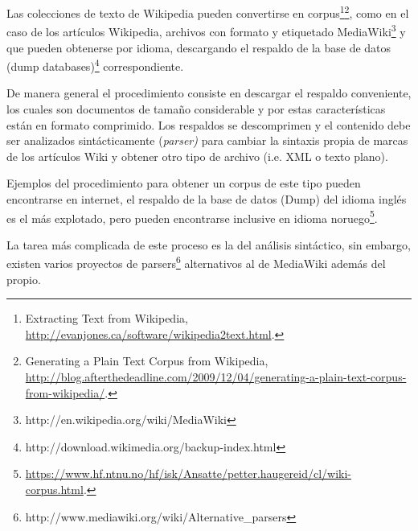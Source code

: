 \documentclass[letterpaper]{article}
\newcommand\textstylebibuscitbase[1]{#1}
\begin{document}
{\sffamily
\textstylebibuscitbase{Las colecciones de texto de Wikipedia pueden
convertirse en corpus}\footnote{\foreignlanguage{english}{Extracting
Text from Wikipedia,
}\url{http://evanjones.ca/software/wikipedia2text.html}\foreignlanguage{english}{.}}\footnote{\foreignlanguage{english}{G}\foreignlanguage{english}{enerating
a Plain Text Corpus from Wikipedia,
}\url{http://blog.afterthedeadline.com/2009/12/04/generating-a-plain-text-corpus-from-wikipedia/}\foreignlanguage{english}{.}}\textstylebibuscitbase{,
como }\textstylebibuscitbase{en el caso de }\textstylebibuscitbase{los
art\'iculos Wikipedia, archivos con formato y etiquetado
MediaWiki}\footnote{http://en.wikipedia.org/wiki/MediaWiki}\textstylebibuscitbase{
y que pueden obtenerse por idioma, descargando el respaldo de la
}\textstylebibuscitbase{base de datos (dump
databases)}\footnote{http://download.wikimedia.org/backup-index.html}\textstylebibuscitbase{
correspondiente.}}


\bigskip

{\sffamily
\textstylebibuscitbase{De manera general el procedimiento consiste en
descargar el respaldo conveniente, los cuales son documentos de
tama\~no considerable y por estas
}\textstylebibuscitbase{caracter\'isticas est\'an en formato
comprimido. Los respaldos se descomprimen y }\textstylebibuscitbase{el
contenido debe ser analizados sint\'acticamente
(}\textstylebibuscitbase{\textit{parser)}}\textstylebibuscitbase{ para
cambiar la sintaxis }\textstylebibuscitbase{propia
}\textstylebibuscitbase{de marcas de los art\'iculos Wiki y obtener
otro tipo de archivo (i.e. XML o texto plano).}}


\bigskip

{\sffamily
\textstylebibuscitbase{Ejemplos del procedimiento para obtener un corpus
de este tipo pueden }\textstylebibuscitbase{encontrarse en internet, el
respaldo de la base de datos (Dump) del idioma ingl\'es es el m\'as
explotado, pero pueden encontrarse inclusive en idioma
}\textstylebibuscitbase{noruego}\footnote{\url{https://www.hf.ntnu.no/hf/isk/Ansatte/petter.haugereid/cl/wiki-corpus.html}\foreignlanguage{english}{.}}\textstylebibuscitbase{.}}


\bigskip

{\sffamily
\textstylebibuscitbase{La tarea m\'as complicada de este proceso es la
del an\'alisis sint\'actico, sin }\textstylebibuscitbase{embargo,
existen varios proyectos de
parsers}\footnote{http://www.mediawiki.org/wiki/Alternative\_parsers}\textstylebibuscitbase{
alternativos al de MediaWiki adem\'as del propio.}}
\end{document}
